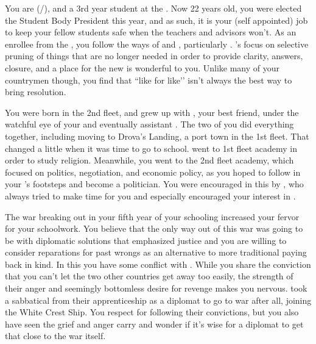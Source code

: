 \documentclass[char]{GL2020}
\begin{document}
\name{\cPresident{}}

You are \cPresident{\full} (\cPresident{\they}/\cPresident{\them}), and a 3rd year student at the \pSchool{}. Now 22 years old, you were elected the Student Body President this year, and as such, it is your (self appointed) job to keep your fellow students safe when the teachers and advisors won't. As an enrollee from the \pShip{}, you follow the ways of \cEbb{\full} and \cFlow{\full}, particularly \cEbb{}. \cEbb{}'s focus on selective pruning of things that are no longer needed in order to provide clarity, answers, closure, and a place for the new is wonderful to you. Unlike many of your countrymen though, you find that ``like for like’’ isn’t always the best way to bring resolution.

You were born in the 2nd fleet, and grew up with \cInitiate{\full}, your best friend, under the watchful eye of your \cHeadDiplomat{\Auncle} \cHeadDiplomat{\full} and eventually \cHeadDiplomat{\their} assistant \cJuniorStatesman{\full}. The two of you did everything together, including moving to Drova's Landing, a port town in the 1st fleet. That changed a little when it was time to go to school. \cInitiate{\They} went to 1st fleet academy in order to study religion. Meanwhile, you went to the 2nd fleet academy, which focused on politics, negotiation, and economic policy, as you hoped to follow in your \cHeadDiplomat{\auncle}'s footsteps and become a politician. You were encouraged in this by \cJuniorStatesman{}, who always tried to make time for you and especially encouraged your interest in \cEbb{}. 

The war breaking out in your fifth year of your schooling increased your fervor for your schoolwork. You believe that the only way out of this war was going to be with diplomatic solutions that emphasized justice and you are willing to consider reparations for past wrongs as an alternative to more traditional paying back in kind. In this you have some conflict with \cJuniorStatesman{}. While you share the conviction that you can’t let the two other countries get away too easily, the strength of their anger and seemingly bottomless desire for revenge makes you nervous. \cJuniorStatesman{} took a sabbatical from their apprenticeship as a diplomat to go to war after all, joining the White Crest Ship. You respect \cJuniorStatesman{\them} for following their convictions, but you also have seen the grief and anger \cJuniorStatesman{\they} carry and wonder if it's wise for a diplomat to get that close to the war itself.  
\end{document}
